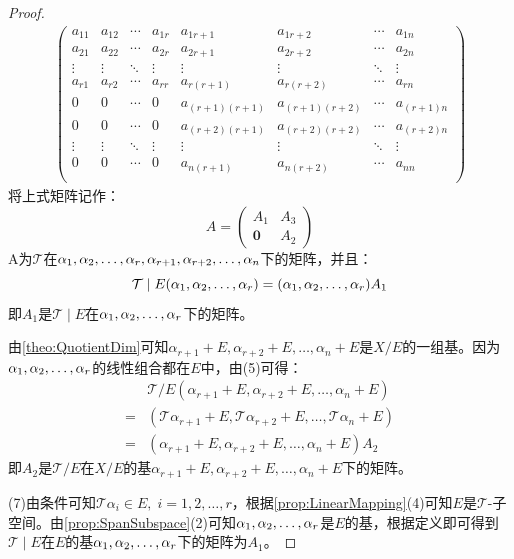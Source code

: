 \begin{proof}
\begin{gather*}
		\begin{pmatrix}
			a_{11} & a_{12} & \cdots & a_{1r} & a_{1r+1} & a_{1r+2} & \cdots & a_{1n} \\
			a_{21} & a_{22} & \cdots & a_{2r} & a_{2r+1} & a_{2r+2} & \cdots & a_{2n} \\
			\vdots & \vdots  & \ddots & \vdots  & \vdots  & \vdots  & \ddots & \vdots  \\
			a_{r1} & a_{r2} & \cdots & a_{rr} & a_{r(r+1)} & a_{r(r+2)} & \cdots & a_{rn} \\
			0 & 0 & \cdots & 0 & a_{(r+1)(r+1)} & a_{(r+1)(r+2)} & \cdots & a_{(r+1)n} \\
			0 & 0 & \cdots & 0 & a_{(r+2)(r+1)} & a_{(r+2)(r+2)} & \cdots & a_{(r+2)n} \\
			\vdots & \vdots  & \ddots & \vdots  & \vdots  & \vdots  & \ddots & \vdots  \\
			0 & 0 & \cdots & 0 & a_{n(r+1)} & a_{n(r+2)} & \cdots & a_{nn} \\
		\end{pmatrix}
	\end{gather*}
	将上式矩阵记作：
	\begin{equation*}
		A=\begin{pmatrix}
			A_1 & A_3 \\
			\mathbf{0} & A_2
		\end{pmatrix}
	\end{equation*}
	A为$\mathcal{T}$在$\alpha_1, \alpha_2, \dots, \alpha_{r},\alpha_{r+1},\alpha_{r+2},\dots,\alpha_n$下的矩阵，并且：
	\begin{equation*}
		\mathcal{T}\mid E(\alpha_1, \alpha_2, \dots, \alpha_{r})=(\alpha_1, \alpha_2, \dots, \alpha_{r})A_1
	\end{equation*}
	即$A_1$是$\mathcal{T}\mid E$在$\alpha_1, \alpha_2, \dots, \alpha_{r}$下的矩阵。\par
	由\cref{theo:QuotientDim}可知$\alpha_{r+1}+E,\alpha_{r+2}+E,\dots,\alpha_{n}+E$是$X/E$的一组基。因为$\alpha_1, \alpha_2, \dots, \alpha_{r}$的线性组合都在$E$中，由(5)可得：
	\begin{align*}
		&\mathcal{T}/E(\alpha_{r+1}+E,\alpha_{r+2}+E,\dots,\alpha_{n}+E) \\
		=&(\mathcal{T}\alpha_{r+1}+E,\mathcal{T}\alpha_{r+2}+E,\dots,\mathcal{T}\alpha_{n}+E) \\
		=&(\alpha_{r+1}+E,\alpha_{r+2}+E,\dots,\alpha_{n}+E)A_2
	\end{align*}
	即$A_2$是$\mathcal{T}/E$在$X/E$的基$\alpha_{r+1}+E,\alpha_{r+2}+E,\dots,\alpha_n+E$下的矩阵。\par
	(7)由条件可知$\mathcal{T}\alpha_i\in E,\;i=1,2,\dots,r$，根据\cref{prop:LinearMapping}(4)可知$E$是$\mathcal{T}$-子空间。由\cref{prop:SpanSubspace}(2)可知$\alpha_1, \alpha_2, \dots, \alpha_{r}$是$E$的基，根据定义即可得到$\mathcal{T}\mid E$在$E$的基$\alpha_1, \alpha_2, \dots, \alpha_{r}$下的矩阵为$A_1$。
\end{proof}
